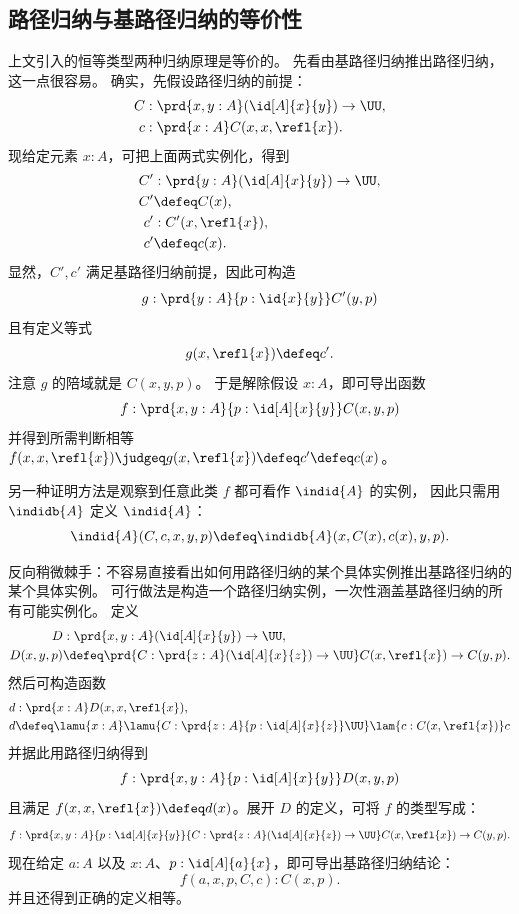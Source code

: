 %
%

\subsection{路径归纳与基路径归纳的等价性}

上文引入的恒等类型两种归纳原理是等价的。
先看由基路径归纳推出路径归纳，这一点很容易。
确实，先假设路径归纳的前提：
\begin{align*}
C &: \prd{x,y:A}(\id[A]{x}{y}) \to \UU,\\
c &: \prd{x:A} C(x,x,\refl{x}).
\end{align*}
现给定元素 $x:A$，可把上面两式实例化，得到
\begin{align*}
C' &: \prd{y:A} (\id[A]{x}{y}) \to \UU,  \\
C' &\defeq C(x), \\
c' &: C'(x,\refl{x}), \\
c' &\defeq c(x).
\end{align*}
显然，$C',c'$ 满足基路径归纳前提，因此可构造
\begin{equation*}
  g : \prd{y:A}{p : \id{x}{y}} C'(y,p)
\end{equation*}
且有定义等式
\[ g(x,\refl{x}) \defeq c'.\]
注意 $g$ 的陪域就是 $C(x,y,p)$。
于是解除假设 $x:A$，即可导出函数
\[ f : \prd{x,y:A}{p : \id[A]{x}{y}} C(x,y,p) \]
并得到所需判断相等
$f(x,x,\refl{x}) \judgeq g(x,\refl{x}) \defeq c' \defeq c(x)$。

另一种证明方法是观察到任意此类 $f$ 都可看作 $\indid{A}$ 的实例，
因此只需用 $\indidb{A}$ 定义 $\indid{A}$：
\[ \indid{A}(C,c,x,y,p) \defeq \indidb{A}(x,C(x),c(x),y,p). \]

反向稍微棘手：不容易直接看出如何用路径归纳的某个具体实例推出基路径归纳的某个具体实例。
可行做法是构造一个路径归纳实例，一次性涵盖基路径归纳的所有可能实例化。
定义
\begin{align*}
D &: \prd{x,y:A} (\id[A]{x}{y}) \to \UU, \\
D(x,y,p) &\defeq \prd{C : \prd{z:A} (\id[A]{x}{z}) \to \UU} C(x,\refl{x}) \to C(y,p).
\end{align*}
然后可构造函数
\begin{align*}
d &: \prd{x : A} D(x,x,\refl{x}), \\
d &\defeq \lamu{x:A}\lamu{C:\prd{z:A}{p : \id[A]{x}{z}} \UU}\lam{c:C(x,\refl{x})} c
\end{align*}
并据此用路径归纳得到
\[ f : \prd{x,y:A}{p:\id[A]{x}{y}} D(x,y,p) \]
且满足 $f(x,x,\refl{x}) \defeq d(x)$。展开 $D$ 的定义，可将 $f$ 的类型写成：
\[ f : \prd{x,y:A}{p:\id[A]{x}{y}}{C : \prd{z:A} (\id[A]{x}{z}) \to \UU} C(x,\refl{x}) \to C(y,p). \]
现在给定 $a:A$ 以及 $x:A$、$p:\id[A]{a}{x}$，即可导出基路径归纳结论：
\[ f(a,x,p,C,c) : C(x,p). \]
并且还得到正确的定义相等。

